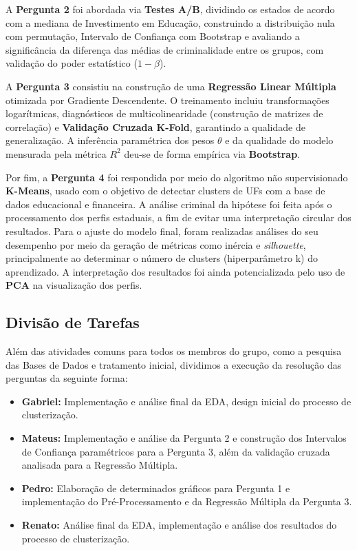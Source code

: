 \documentclass[10pt]{article}
\begin{document}
A \textbf{Pergunta 2} foi abordada via \textbf{Testes A/B}, dividindo os estados de acordo com a mediana de Investimento em Educação, construindo a distribuição nula com permutação, Intervalo de Confiança com Bootstrap e avaliando a significância da diferença das médias de criminalidade entre os grupos, com validação do poder estatístico ($1 - \beta$).

A \textbf{Pergunta 3} consistiu na construção de uma \textbf{Regressão Linear Múltipla} otimizada por Gradiente Descendente. O treinamento incluiu transformações logarítmicas, diagnósticos de multicolinearidade (construção de matrizes de correlação) e \textbf{Validação Cruzada K-Fold}, garantindo a qualidade de generalização. A inferência paramétrica dos pesos $\theta$ e da qualidade do modelo mensurada pela métrica $R^{2}$ deu-se de forma empírica via \textbf{Bootstrap}.

Por fim, a \textbf{Pergunta 4} foi respondida por meio do algoritmo não supervisionado \textbf{K-Means}, usado com o objetivo de detectar clusters de UFs com a base de dados educacional e financeira. A análise criminal da hipótese foi feita após o processamento dos perfis estaduais, a fim de evitar uma interpretação circular dos resultados. Para o ajuste do modelo final, foram realizadas análises do seu desempenho por meio da geração de métricas como inércia e \textit{silhouette}, principalmente ao determinar o número de clusters (hiperparâmetro k) do aprendizado. A interpretação dos resultados foi ainda potencializada pelo uso de \textbf{PCA} na visualização dos perfis.

\subsection{Divisão de Tarefas}
Além das atividades comuns para todos os membros do grupo, como a pesquisa das Bases de Dados e tratamento inicial, dividimos a execução da resolução das perguntas da seguinte forma:
\begin{itemize}
    \item \textbf{Gabriel:} Implementação e análise final da EDA, design inicial do processo de clusterização.
    \item \textbf{Mateus:}  Implementação e análise da Pergunta 2 e construção dos Intervalos de Confiança paramétricos para a Pergunta 3, além da validação cruzada analisada para a Regressão Múltipla.
    \item \textbf{Pedro:}  Elaboração de determinados gráficos para Pergunta 1 e implementação do Pré-Processamento e da Regressão Múltipla da Pergunta 3.
    \item \textbf{Renato:} Análise final da EDA, implementação e análise dos resultados do processo de clusterização.
\end{itemize}
\end{document}
